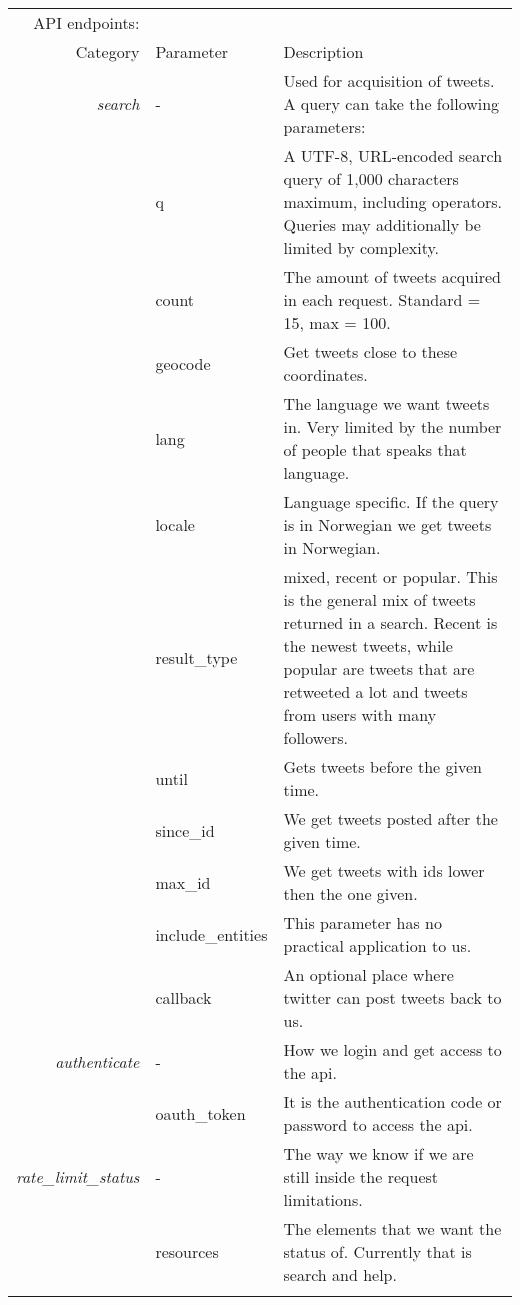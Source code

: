 \begin{tabular}{ r l | p{7cm} }
API endpoints:\\
Category & Parameter & Description\\
\hline

\textit{search} & - & Used for acquisition of tweets. A query can take the
following parameters: \\
& q & A UTF-8, URL-encoded search query of 1,000 characters maximum,
including operators. Queries may additionally be limited by complexity. \\
& count & The amount of tweets acquired in each request. Standard =
15, max = 100. \\
& geocode & Get tweets close to these coordinates. \\
& lang & The language we want tweets in. Very limited by the number of people that speaks that language. \\
& locale & Language specific. If the query is in Norwegian we get tweets in Norwegian.\\
& result\_type & mixed, recent or popular. This is the general mix of tweets
returned in a search. Recent is the newest tweets, while popular are tweets that
are retweeted a lot and tweets from users with many followers. \\
& until & Gets tweets before the given time. \\
& since\_id & We get tweets posted after the given time. \\
& max\_id & We get tweets with ids lower then the one given. \\
& include\_entities & This parameter has no practical application to us. \\
& callback & An optional place where twitter can post tweets back to us. \\

\hline
\textit{authenticate} & - & How we login and get access to the api. \\
& oauth\_token & It is the authentication code or password to access
the api. \\

\hline
\textit{rate\_limit\_status} & - & The way we know if we are still inside
the request limitations. \\
& resources & The elements that we want the status of. Currently that
is search and help. \\ 

\label{tbl:twitterAPIendpoints}
\end{tabular}
%

